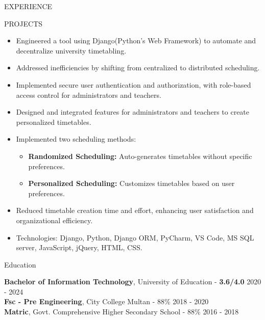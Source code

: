 \documentclass{resume} %
\begin{document}
\begin{rSection}{EXPERIENCE}
\begin{rSection}{PROJECTS}
\fi
 
 \begin{itemize}
 	\item Engineered a tool using Django(Python's Web Framework) to automate and decentralize university timetabling.
 	\item Addressed inefficiencies by shifting from centralized to distributed scheduling.
 	\item Implemented secure user authentication and authorization, with role-based access control for administrators and teachers.
 	\item Designed and integrated features for administrators and teachers to create personalized timetables.
 	\item Implemented two scheduling methods:
 	\begin{itemize}
 		\item \textbf{Randomized Scheduling:} Auto-generates timetables without specific preferences.
 		\item \textbf{Personalized Scheduling:} Customizes timetables based on user preferences.
 	\end{itemize}
 	\item Reduced timetable creation time and effort, enhancing user satisfaction and organizational efficiency.
 	\item Technologies: Django, Python, Django ORM, PyCharm, VS Code, MS SQL server, JavaScript, jQuery, HTML, CSS.
 \end{itemize}

\end{rSection} 
\end{rSection} 

\begin{rSection}{Education}
	
	
	{\bf Bachelor of Information Technology}, University of Education - {\bf 3.6/4.0 }\hfill {2020 - 2024} 
	\\
	{\bf Fsc  - Pre Engineering}, City College Multan - 88\% \hfill {2018 - 2020}
	\\
	{\bf Matric}, Govt. Comprehensive Higher Secondary School - 88\% \hfill {2016 - 2018}
	
	
\end{rSection}
\end{document}
